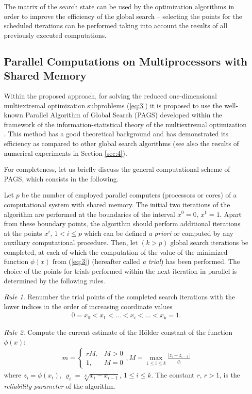 \documentclass[runningheads]{llncs}
\begin{document}
The matrix of the search state can be used by the optimization algorithms in order to improve the efficiency of the global search -- selecting the points for the scheduled iterations can be performed taking into account the results of all previously executed computations. 



\subsection{Parallel Computations on Multiprocessors with Shared Memory }
\label{ssec:33}

Within the proposed approach, for solving the reduced one-dimensional multiextremal optimization subproblems (\ref{eq:3}) it is proposed to use the well-known Parallel Algorithm of Global Search (PAGS) developed within the framework of the information-statistical theory of the multiextremal optimization \cite{c7,c25}. This method has a good theoretical background and has demonstrated its efficiency as compared to other global search algorithms (see also the results of numerical experiments in Section \ref{sec:4}).

For completeness, let us briefly discuss the general computational scheme of PAGS, which consists in the following.

Let $p$ be the number of employed parallel computers (processors or cores) of a computational system with shared memory. The initial two iterations of the algorithm are performed at the boundaries of the interval $x^0=0$, $x^1=1$. Apart from these boundary points, the algorithm should perform additional iterations at the points $x^i$, $1<i \leq p$ which can be defined \textit{a priori} or computed by any auxiliary computational procedure. Then, let $(k>p)$ global search iterations be completed, at each of which the computation of the value of the minimized function $\phi(x)$ from (\ref{eq:3}) (hereafter called \textit{a trial}) has been performed. The choice of the points for trials performed within the next iteration in parallel is determined by the following rules.

\textit{Rule 1.} Renumber the trial points of the completed search iterations with the lower indices in the order of increasing coordinate values
\begin{eqnarray} \label{eq:08}
	0=x_0<x_1<\dots<x_i<\dots<x_k=1.
\end{eqnarray}

\textit{Rule 2.} Compute the current estimate of the H\"{o}lder constant of the function $\phi(x)$:
\begin{eqnarray} \label{eq:09}
	m = 
 \begin{cases}
   r M, & M > 0 \\
   1,   & M = 0
 \end{cases} ,
 M = \max_{1 \leq i \leq k} {\frac{|z_i - z_{i-1}|} {\varrho_i} }
\end{eqnarray}
where $z_i=\phi(x_i)$, $\varrho_i=\sqrt[N]{x_i-x_{i-1}}$, $1 \leq i \leq k$. The constant $r$, $r>1$, is the \textit{reliability parameter} of the algorithm.
\end{document}
